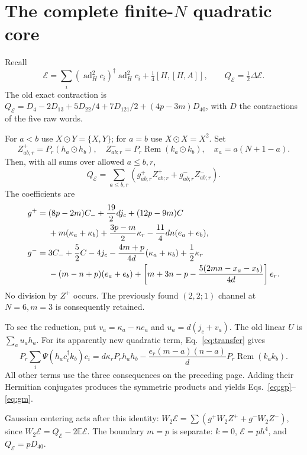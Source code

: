 \documentclass[11pt,a4paper]{article}
\newcommand{\EE}{\mathbb E}
\newcommand{\core}{\mathcal E}
\DeclareMathOperator{\Rem}{Rem}
\begin{document}
\newpage
\section{The complete finite-$N$ quadratic core}
Recall
\begin{equation}
 \core=\sum_i(\operatorname{ad}_H^2c_i)^\dagger
                \operatorname{ad}_H^2c_i+\tfrac14[H,[H,A]],
 \qquad Q_{\core}=\tfrac12\Delta\core.
\end{equation}
The old exact contraction is
$Q_{\core}=D_4-2D_{13}+5D_{22}/4+7D_{121}/2+(4p-3m)D_{40}$,
with $D$ the contractions of the five raw words.

For $a<b$ use $X\odot Y=\{X,Y\}$; for $a=b$ use $X\odot X=X^2$.
Set
\begin{equation}
 Z^+_{ab;r}=P_r(h_a\odot h_b),\quad
 Z^-_{ab;r}=P_r\Rem(k_a\odot k_b),\quad
 x_a=a(N+1-a).
\end{equation}
Then, with all sums over allowed $a\le b,r$,
\begin{equation}
 \boxed{Q_{\core}=\sum_{a\le b,r}
          \left(g^+_{ab;r}Z^+_{ab;r}+g^-_{ab;r}Z^-_{ab;r}\right).}
 \label{eq:core}
\end{equation}
The coefficients are
\begin{align}
 g^+={}&(8p-2m)C_-+\frac{19}{2}d j_c+(12p-9m)C\notag\\
       &+m(\kappa_a+\kappa_b)+\frac{3p-m}{2}\kappa_r
                  -\frac{11}{4}dn(e_a+e_b),\label{eq:gp}\\
 g^-={}&3C_-+\frac52 C-4j_c
        -\frac{4m+p}{4d}(\kappa_a+\kappa_b)+\frac12\kappa_r\notag\\
       &-(m-n+p)(e_a+e_b)
        +\left[m+3n-p-\frac{5(2mn-x_a-x_b)}{4d}\right]e_r.
 \label{eq:gm}
\end{align}
No division by $Z^+$ occurs. The previously found $(2,2;1)$ channel
at $N=6,m=3$ is consequently retained.

To see the reduction, put $v_a=\kappa_a-ne_a$ and
$u_a=d(j_c+v_a)$. The old linear $U$ is $\sum_a u_ah_a$.
For its apparently new quadratic term, Eq.~\eqref{eq:transfer} gives
\begin{equation}
 P_r\sum_i\Psi(h_ac_i^\dagger k_b)c_i
 =d\kappa_rP_rh_ah_b
  -\frac{e_r(m-a)(n-a)}d P_r\Rem(k_ak_b).
\end{equation}
All other terms use the three consequences on the preceding page.
Adding their Hermitian conjugates produces the symmetric products
and yields Eqs.~\eqref{eq:gp}--\eqref{eq:gm}.

Gaussian centering acts after this identity:
$W_2\core=\sum(g^+W_2Z^++g^-W_2Z^-)$, since
$W_2\core=Q_{\core}-2\EE\core$.
The boundary $m=p$ is separate: $k=0$, $\core=p h^4$, and
$Q_{\core}=pD_{40}$.
\end{document}
